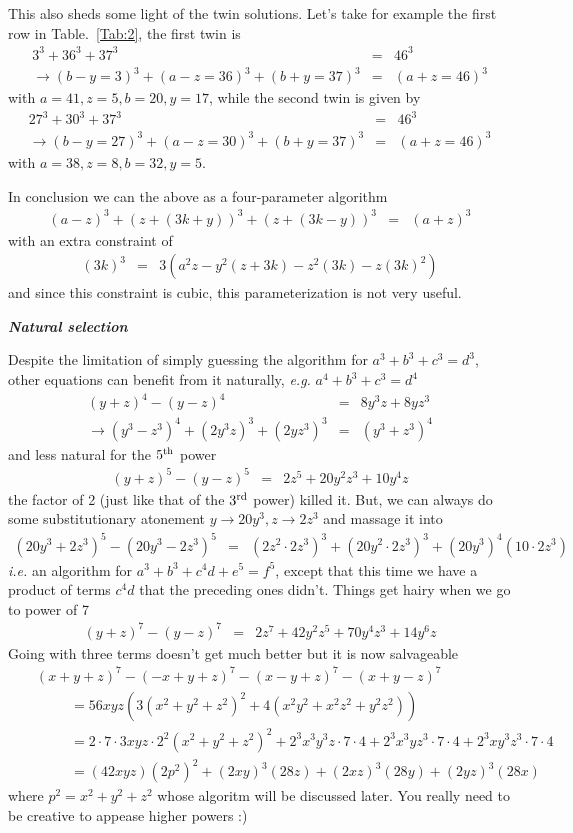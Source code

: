 \documentclass[aps,preprint,preprintnumbers,nofootinbib,showpacs,prd]{revtex4-1}
\newcommand{\ie}{{\it i.e.} }
\newcommand{\eg}{{\it e.g.} }
\newcommand{\nbea}{\begin{eqnarray*}}
\newcommand{\neea}{\end{eqnarray*}}
\begin{document}
This also sheds some light of the twin solutions. Let's take for example the first row in Table.~\ref{Tab:2}, the first twin is
%
\nbea
3^3 + 36^3 + 37^3 & = & 46^3 \\
\to (b - y = 3)^3 + (a - z = 36)^3 + (b + y = 37)^3 & = & (a + z = 46)^3
\neea
%
with $a=41, z=5, b=20, y=17$, while the second twin is given by 
%
\nbea
27^3 + 30^3 + 37^3 & = & 46^3 \\
\to (b - y = 27)^3 + (a - z = 30)^3 + (b + y = 37)^3 & = & (a + z = 46)^3
\neea
%
with $a=38, z=8, b=32, y=5$.

In conclusion we can the above as a four-parameter algorithm
%
\nbea
(a-z)^3 + (z+(3k + y))^3 + (z+(3k-y))^3 & = & (a+z)^3
\neea
%
with an extra constraint of
%
\nbea
(3k)^3 & = & 3 (a^2z - y^2 (z+3k) - z^2(3k) - z(3k)^2)
\neea
%
and since this constraint is cubic, this parameterization is not very useful.

\bigskip\textbf{\textit{Natural selection}}

Despite the limitation of simply guessing the algorithm for $a^3 + b^3 + c^3 = d^3$, other equations can benefit from it naturally, \eg $a^4 + b^3 + c^3 = d^4$
%
\nbea
(y+z)^4 - (y-z)^4 & = & 8 y^3 z + 8 y z^3 \\
\rightarrow (y^3-z^3)^4 + (2 y^3 z)^3 + (2 y z^3)^3 & = & (y^3+z^3)^4
\neea
%
and less natural for the $5^{\rm th}$ power
%
\nbea
(y+z)^5 - (y-z)^5 & = & 2 z^5 + 20 y^2 z^3 + 10 y^4 z
\neea
%
the factor of 2 (just like that of the $3^{\rm rd}$ power) killed it. But, we can always do some substitutionary atonement $y \rightarrow 20 y^3, z \rightarrow 2 z^3$ and massage it into
%
\nbea
(20 y^3 + 2 z^3)^5 - (20 y^3 - 2 z^3)^5 & = & (2 z^2 \cdot 2 z^3)^3 + (20 y^2 \cdot 2 z^3)^3 + (20 y^3)^4(10 \cdot 2 z^3)
\neea
%
\ie an algorithm for $a^3 + b^3 + c^4 d + e^5 = f^5$, except that this time we have a product of terms $c^4 d$ that the preceding ones didn't. Things get hairy when we go to power of 7
%
\nbea
(y+z)^7 - (y-z)^7 & = & 2 z^7 + 42 y^2 z^5 + 70 y^4 z^3 + 14 y^6 z
\neea
%
Going with three terms doesn't get much better but it is now salvageable
%
\nbea
&& (x+y+z)^7 - (-x+y+z)^7 - (x-y+z)^7 - (x+y-z)^7 \\
&& ~~~~~~~~~~~= 56 xyz (3 (x^2+y^2+z^2)^2 + 4(x^2 y^2+x^2 z^2+y^2 z^2)) \\
&& ~~~~~~~~~~~= 2 \cdot 7 \cdot 3 xyz \cdot 2^2 (x^2+y^2+z^2)^2 + 2^3 x^3y^3z \cdot 7\cdot 4 + 2^3 x^3yz^3 \cdot 7\cdot 4 + 2^3 xy^3z^3 \cdot 7\cdot 4 \\
&& ~~~~~~~~~~~= (42 xyz) (2 p^2)^2 + (2 xy)^3 (28 z)  + (2 x z)^3 (28 y) + (2 y z)^3 (28 x)
\neea
%
where $p^2 = x^2+y^2+z^2$ whose algoritm will be discussed later. You really need to be creative to appease higher powers :)
\end{document}
